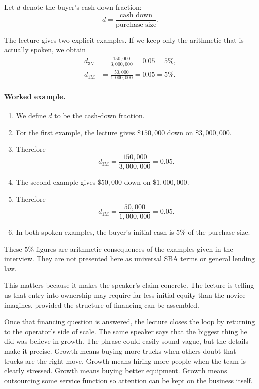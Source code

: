 \begin{definition}
Let \(d\) denote the buyer's cash-down fraction:
\begin{equation}
d=\frac{\text{cash down}}{\text{purchase size}}.
\end{equation}
\end{definition}

The lecture gives two explicit examples. If we keep only the arithmetic that is actually spoken, we obtain
\begin{align}
d_{3\text{M}} &= \frac{150{,}000}{3{,}000{,}000} = 0.05 = 5\%,\\
d_{1\text{M}} &= \frac{50{,}000}{1{,}000{,}000} = 0.05 = 5\%.
\end{align}

\paragraph{Worked example.}
\begin{enumerate}
\item We define \(d\) to be the cash-down fraction.
\item For the first example, the lecture gives \( \$150{,}000 \) down on \( \$3{,}000{,}000 \).
\item Therefore
\[
d_{3\text{M}}=\frac{150{,}000}{3{,}000{,}000}=0.05.
\]
\item The second example gives \( \$50{,}000 \) down on \( \$1{,}000{,}000 \).
\item Therefore
\[
d_{1\text{M}}=\frac{50{,}000}{1{,}000{,}000}=0.05.
\]
\item In both spoken examples, the buyer's initial cash is \(5\%\) of the purchase size.
\end{enumerate}

\begin{remark}
These \(5\%\) figures are arithmetic consequences of the examples given in the interview. They are not presented here as universal SBA terms or general lending law.
\end{remark}

This matters because it makes the speaker's claim concrete. The lecture is telling us that entry into ownership may require far less initial equity than the novice imagines, provided the structure of financing can be assembled.

Once that financing question is answered, the lecture closes the loop by returning to the operator's side of scale. The same speaker says that the biggest thing he did was believe in growth. The phrase could easily sound vague, but the details make it precise. Growth means buying more trucks when others doubt that trucks are the right move. Growth means hiring more people when the team is clearly stressed. Growth means buying better equipment. Growth means outsourcing some service function so attention can be kept on the business itself.

